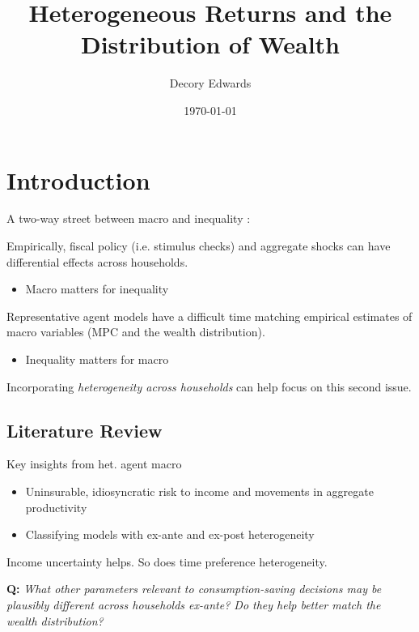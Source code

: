 \documentclass{beamer}
\title[]{Heterogeneous Returns and the Distribution of Wealth}
\author[Edwards]{Decory Edwards}
\institute[JHU]{Johns Hopkins University}
\date{\today}
\begin{document}
\begin{frame}
  \titlepage
\end{frame}

\section{Introduction}

\begin{frame}{A two-way street between macro and inequality \parencite{Ahn2017} :}


Empirically, fiscal policy (i.e. stimulus checks) and aggregate shocks can have differential effects across households.

\begin{itemize}
\item Macro matters for inequality
\end{itemize}
\vspace{2.5mm}

Representative agent models have a difficult time matching empirical estimates of macro variables (MPC and the wealth distribution).

\begin{itemize}
\item Inequality matters for macro
\end{itemize}

Incorporating \textit{heterogeneity across households} can help focus on this second issue.

\end{frame}

\subsection{Literature Review}


\begin{frame}{Key insights from het. agent macro}

    \begin{itemize}
    \item Uninsurable, idiosyncratic risk to income and movements in aggregate productivity \parencite{ks1998}
    \item Classifying models with ex-ante and ex-post heterogeneity \parencite{gkgv22}
    \end{itemize}
    
    Income uncertainty helps. So does time preference heterogeneity.

    \vspace{10mm}
    \textbf{Q:} \textit{What other parameters relevant to consumption-saving decisions may be plausibly different across households ex-ante? Do they help better match the wealth distribution?}

\end{frame}
\end{document}
